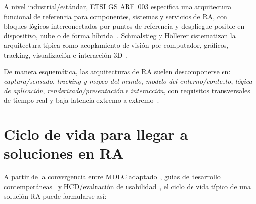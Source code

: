 \documentclass[conference]{IEEEtran}
\begin{document}
A nivel industrial/est\'andar, ETSI GS ARF~003 especifica una arquitectura funcional de referencia para componentes, sistemas y servicios de RA, con bloques l\'ogicos interconectados por puntos de referencia y despliegue posible en dispositivo, nube o de forma h\'ibrida~\cite{etsi_arf003}. Schmalstieg y H\"ollerer sistematizan la arquitectura t\'ipica como acoplamiento de visi\'on por computador, gr\'aficos, tracking, visualizaci\'on e interacci\'on 3D~\cite{schmalstieg2016principles}.

De manera esquem\'atica, las arquitecturas de RA suelen descomponerse en: \emph{captura/sensado}, \emph{tracking y mapeo del mundo}, \emph{modelo del entorno/contexto}, \emph{l\'ogica de aplicaci\'on}, \emph{renderizado/presentaci\'on} e \emph{interacci\'on}, con requisitos transversales de tiempo real y baja latencia extremo a extremo~\cite{reicher2003architecture,etsi_arf003}.

\section{Ciclo de vida para llegar a soluciones en RA}

A partir de la convergencia entre MDLC adaptado~\cite{roedavan2025mdlc}, gu\'ias de desarrollo contempor\'aneas~\cite{devagiri2024essentials} y HCD/evaluaci\'on de usabilidad~\cite{iso9241_210,nist2022ar}, el ciclo de vida t\'ipico de una soluci\'on RA puede formularse as\'i:
\end{document}
